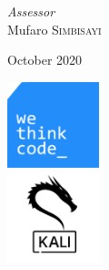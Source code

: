 \begin{titlepage}
	\vfill
	{\large\textit{Assessor}}\\
	Mufaro \textsc{Simbisayi}\\ %
	
	\vfill\vfill\vfill %
	
	\large{October 2020}\\ %
	
	
	\vfill\vfill
	
	\includegraphics[width=0.2\textwidth]{00.title/index.png}\\[1cm] %
	\includegraphics[width=0.2\textwidth]{00.title/docker.png}\\[1cm] %
	
	\vfill %
	
\end{titlepage}


%
